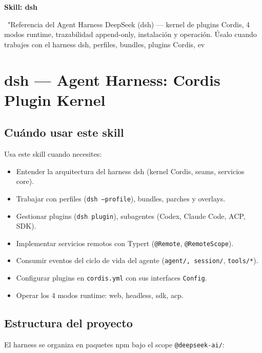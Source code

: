 \documentclass[11pt,a4paper]{article}
\newcommand{\iconoBanda}{microchip}
\newcommand{\bandaTitulo}[3][fondoOscuro]{%
  \begin{tcolorbox}[
    enhanced,
    colback=#1, colframe=#1,
    boxrule=0pt, arc=8pt, outer arc=8pt,
    width=\linewidth,
    top=18pt, bottom=6pt, left=14pt, right=14pt,
    borderline south={3.5pt}{0pt}{cyanNeon},
  ]
    \begin{minipage}[c]{0.07\linewidth}
      \centering
      \textcolor{cyanNeon}{\fontsize{30}{30}\selectfont\faIcon{\iconoBanda}}
    \end{minipage}%
    \hspace{8pt}%
    \begin{minipage}[c]{0.88\linewidth}
      {\fontsize{20}{24}\selectfont\bfseries\color{white}#2}\par\vspace{5pt}%
      \textcolor{cyanNeon!80!white}{\small\faIcon{angle-right}~#3}%
    \end{minipage}
    \vspace{4pt}
  \end{tcolorbox}%
  \vspace{8pt}%
}
\renewcommand{\iconoBanda}{book}
\begin{document}
\bandaTitulo[fondoOscuro]{Skill: dsh}{"Referencia del Agent Harness DeepSeek (dsh) — kernel de plugins Cordis, 4 modos runtime, trazabilidad append-only, instalación y operación. Úsalo cuando trabajes con el harness dsh, perfiles, bundles, plugins Cordis, ev}

\section*{dsh — Agent Harness: Cordis Plugin Kernel}


\subsection*{Cuándo usar este skill}


Usa este skill cuando necesites:


\begin{itemize}[leftmargin=*,topsep=2pt,itemsep=1pt]
  \item Entender la arquitectura del harness dsh (kernel Cordis, seams, servicios core).
  \item Trabajar con perfiles (\texttt{dsh --profile}), bundles, parches y overlays.
  \item Gestionar plugins (\texttt{dsh plugin}), subagentes (Codex, Claude Code, ACP, SDK).
  \item Implementar servicios remotos con Typert (\texttt{@Remote}, \texttt{@RemoteScope}).
  \item Consumir eventos del ciclo de vida del agente (\texttt{agent/\textit{}, \texttt{session/}}, \texttt{tools/*}).
  \item Configurar plugins en \texttt{cordis.yml} con sus interfaces \texttt{Config}.
  \item Operar los 4 modos runtime: web, headless, sdk, acp.
\end{itemize}


\subsection*{Estructura del proyecto}


El harness se organiza en paquetes npm bajo el scope \texttt{@deepseek-ai/}:
\end{document}
